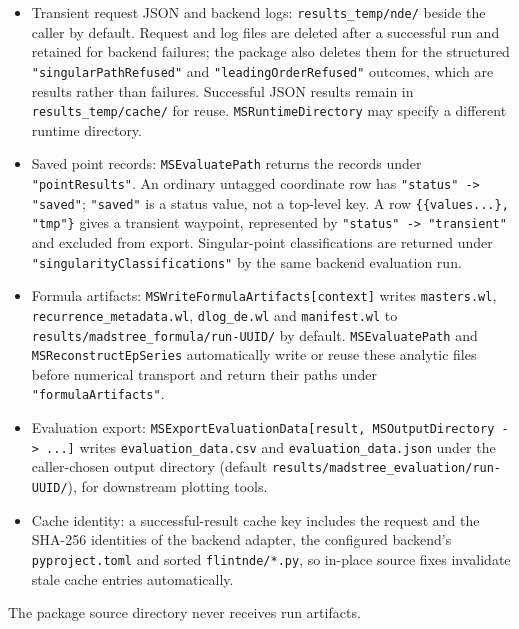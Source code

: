 \documentclass[11pt,a4paper]{article}
\begin{document}
\begin{itemize}
  \item Transient request JSON and backend logs:
        \texttt{results\_temp/\allowbreak nde/} beside the caller by default.
        Request and log files are deleted after a successful run and retained for backend
        failures; the package also deletes them for the structured \texttt{"singularPathRefused"}
        and \texttt{"leadingOrderRefused"} outcomes, which are results rather than failures.
        Successful JSON results remain in \texttt{results\_temp/\allowbreak cache/} for reuse.
        \texttt{MSRuntimeDirectory} may specify a different runtime directory.
  \item Saved point records: \texttt{MSEvaluatePath} returns the records under
        \texttt{"pointResults"}. An ordinary untagged coordinate row has
        \texttt{"status" -> "saved"}; \texttt{"saved"} is a status value, not a top-level key.
        A row \texttt{\{\{values...\}, "tmp"\}} gives a transient waypoint, represented by
        \texttt{"status" -> "transient"} and excluded from export.
        Singular-point classifications are returned under \texttt{"singularityClassifications"}
        by the same backend evaluation run.
  \item Formula artifacts: \texttt{MSWriteFormulaArtifacts[context]} writes \texttt{masters.wl},
        \texttt{recurrence\_metadata.wl}, \texttt{dlog\_de.wl} and \texttt{manifest.wl} to
        \texttt{results/\allowbreak madstree\_formula/\allowbreak run-UUID/} by default.
        \texttt{MSEvaluatePath} and \texttt{MSReconstructEpSeries} automatically write or reuse
        these analytic files before numerical transport and return their paths under
        \texttt{"formulaArtifacts"}.
  \item Evaluation export: \texttt{MSExportEvaluationData[result, MSOutputDirectory -> ...]} writes
        \texttt{evaluation\_data.csv} and \texttt{evaluation\_data.json} under
        the caller-chosen output directory (default
        \texttt{results/\allowbreak madstree\_evaluation/\allowbreak run-UUID/}), for downstream
        plotting tools.
  \item Cache identity: a successful-result cache key includes the request and the SHA-256
        identities of the backend adapter, the configured backend's \texttt{pyproject.toml}
        and sorted \texttt{flintnde/*.py}, so
        in-place source fixes invalidate stale cache entries automatically.
\end{itemize}
The package source directory never receives run artifacts.
\end{document}
